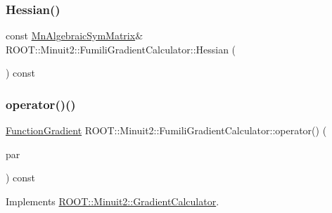 \mbox{\label{classROOT_1_1Minuit2_1_1FumiliGradientCalculator_aa6c751b836a8ce27b7335d7d3d6a653f}} 
\subsubsection{\texorpdfstring{Hessian()}{Hessian()}\hspace{0.1cm}{\footnotesize\ttfamily [3/3]}}
{\footnotesize\ttfamily const \mbox{\hyperlink{namespaceROOT_1_1Minuit2_a9e74ad97f5537a2e80e52b04d98ecc6e}{Mn\+Algebraic\+Sym\+Matrix}}\& R\+O\+O\+T\+::\+Minuit2\+::\+Fumili\+Gradient\+Calculator\+::\+Hessian (\begin{DoxyParamCaption}{ }\end{DoxyParamCaption}) const\hspace{0.3cm}{\ttfamily [inline]}}

\mbox{\label{classROOT_1_1Minuit2_1_1FumiliGradientCalculator_a23fd61bceabbf88e66c5abe6b2815331}} 
\subsubsection{\texorpdfstring{operator()()}{operator()()}\hspace{0.1cm}{\footnotesize\ttfamily [1/6]}}
{\footnotesize\ttfamily \mbox{\hyperlink{classROOT_1_1Minuit2_1_1FunctionGradient}{Function\+Gradient}} R\+O\+O\+T\+::\+Minuit2\+::\+Fumili\+Gradient\+Calculator\+::operator() (\begin{DoxyParamCaption}\item[{const \mbox{\hyperlink{classROOT_1_1Minuit2_1_1MinimumParameters}{Minimum\+Parameters}} \&}]{par }\end{DoxyParamCaption}) const\hspace{0.3cm}{\ttfamily [virtual]}}



Implements \mbox{\hyperlink{classROOT_1_1Minuit2_1_1GradientCalculator_a1bae913e96ffc9ece28664a5f6f79cb0}{R\+O\+O\+T\+::\+Minuit2\+::\+Gradient\+Calculator}}.


